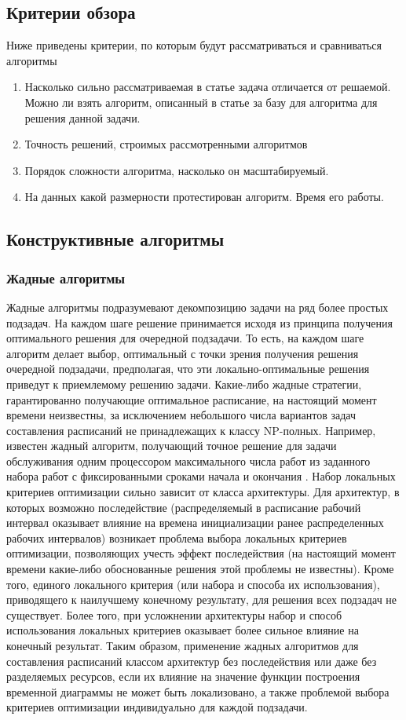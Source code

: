 \subsection{Критерии обзора}
Ниже приведены критерии, по которым будут рассматриваться и сравниваться алгоритмы
\begin{enumerate}
    \item Насколько сильно рассматриваемая в статье задача отличается от решаемой. Можно ли взять алгоритм, описанный в статье за базу для алгоритма для решения данной задачи.
    \item Точность решений, строимых рассмотренными алгоритмов
    \item Порядок сложности алгоритма, насколько он масштабируемый.
    \item На данных какой размерности протестирован алгоритм. Время его работы.
\end{enumerate}
\subsection{Конструктивные алгоритмы}
\subsubsection{Жадные алгоритмы}
Жадные алгоритмы подразумевают декомпозицию задачи на ряд более простых подзадач. На каждом шаге решение принимается исходя из принципа получения оптимального решения для очередной подзадачи. То есть, на каждом шаге алгоритм делает выбор, оптимальный с точки зрения получения решения очередной подзадачи, предполагая, что эти локально-оптимальные решения приведут к приемлемому решению задачи. Какие-либо жадные стратегии, гарантированно получающие оптимальное расписание, на настоящий момент времени неизвестны, за исключением небольшого числа вариантов задач составления расписаний не принадлежащих к классу NP-полных. Например, известен жадный алгоритм, получающий точное решение для задачи обслуживания одним процессором максимального числа работ из заданного набора работ с фиксированными сроками начала и окончания \cite{Cormen}. Набор локальных критериев оптимизации сильно зависит от класса архитектуры. Для архитектур, в которых возможно последействие (распределяемый в расписание рабочий интервал оказывает влияние на времена инициализации ранее распределенных рабочих интервалов) возникает проблема выбора локальных критериев оптимизации, позволяющих учесть эффект последействия (на настоящий момент времени какие-либо обоснованные решения этой проблемы не известны). Кроме того, единого локального критерия (или набора и способа их использования), приводящего к наилучшему конечному результату, для решения всех подзадач не существует. Более того, при усложнении архитектуры набор и способ использования локальных критериев оказывает более сильное влияние на конечный результат. Таким образом, применение жадных алгоритмов для составления расписаний классом архитектур без последействия или даже без разделяемых ресурсов, если их влияние на значение функции построения временной диаграммы не может быть локализовано, а также проблемой выбора критериев оптимизации индивидуально для каждой подзадачи.

